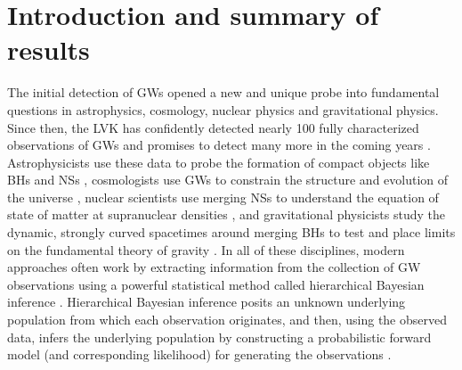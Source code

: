 
\section{Introduction and summary of results}

The initial detection of \acp{GW} \citep{LIGOScientific:2016aoc} opened a new and unique probe into fundamental questions in astrophysics, cosmology, nuclear physics and gravitational physics. Since then, the \ac{LVK} has confidently detected nearly 100 fully characterized observations of \acp{GW} \citep{LIGOScientific:2018mvr, LIGOScientific:2020ibl, LIGOScientific:2021usb, KAGRA:2021vkt} and promises to detect many more in the coming years \citep{KAGRA:2013rdx}. Astrophysicists use these data to probe the formation of compact objects like \acp{BH} and \acp{NS} \citep[e.g.][]{Vitale:2015tea, LIGOScientific:2016vpg, Zevin:2017evb, Mandel:2018hfr, Mandel:2021smh, KAGRA:2021duu}, cosmologists use \acp{GW} to constrain the structure and evolution of the universe \citep[e.g.][]{Schutz:1986gp, Holz:2005df, Messenger:2011gi, LIGOScientific:2017adf, Christensen:2018iqi, Ezquiaga:2022zkx, Gair:2022zsa}, nuclear scientists use merging \acp{NS} to understand the equation of state of matter at supranuclear densities \citep[e.g.][]{Baym:2017whm, Capano:2019eae, Dietrich:2020efo, Chatziioannou:2020pqz, Landry:2020vaw}, and gravitational physicists study the dynamic, strongly curved spacetimes around merging \acp{BH} to test and place limits on the fundamental theory of gravity \citep[e.g.][]{Mirshekari:2011yq, Will:2014kxa, LIGOScientific:2016lio, LIGOScientific:2018dkp, LIGOScientific:2021sio}. In all of these disciplines, modern approaches often work by extracting information from the collection of \ac{GW} observations using a powerful statistical method called hierarchical Bayesian inference \citep[e.g.][]{KAGRA:2021duu, DelPozzo:2011vcw, DelPozzo:2013ala, Isi:2019asy}. Hierarchical Bayesian inference posits an unknown underlying population from which each observation originates, and then, using the observed data, infers the underlying population by constructing a probabilistic forward model (and corresponding likelihood) for generating the observations \citep[see, e.g.][]{Essick:2023upv}.

